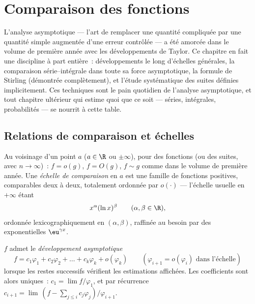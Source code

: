 \chapter{Comparaison des fonctions}\label{ch:b2:comparison}

L'analyse asymptotique --- l'art de remplacer une quantité compliquée
par une quantité simple augmentée d'une erreur contrôlée --- a été
amorcée dans le volume de première année avec les développements de
Taylor. Ce chapitre en fait une discipline à part entière~:
développements le long d'échelles générales, la comparaison
série--intégrale dans toute sa force asymptotique, la formule de
Stirling (démontrée complètement), et l'étude systématique des suites
définies implicitement. Ces techniques sont le pain quotidien de
l'analyse asymptotique, et tout chapitre ultérieur qui estime quoi que
ce soit --- séries, intégrales, probabilités --- se nourrit à cette
table.

\section{Relations de comparaison et échelles}

\begin{definition}\label{def:b2:comparison:landau}
Au voisinage d'un point $a$ ($a \in \R$ ou $\pm\infty$), pour des
fonctions (ou des suites, avec $n \to \infty$)~: $f = o(g)$, $f =
O(g)$, $f \sim g$ comme dans le volume de première année. Une
\emph{échelle de comparaison} en $a$ est
une famille de fonctions positives, comparables deux à deux, totalement
ordonnée par $o(\cdot)$ --- l'échelle usuelle en $+\infty$ étant
\[
x^{\alpha} (\ln x)^{\beta}
\qquad (\alpha, \beta \in \R),
\]
ordonnée lexicographiquement en $(\alpha, \beta)$, raffinée au besoin
par des exponentielles $\eu^{\gamma x}$.
\end{definition}

\begin{definition}\label{def:b2:comparison:expansion}
$f$ admet le \emph{développement asymptotique}
\[
f = c_1 \varphi_1 + c_2\varphi_2 + \dots + c_k \varphi_k +
o(\varphi_k)
\qquad (\varphi_{i+1} = o(\varphi_i) \text{ dans l'échelle})
\]
lorsque les restes successifs vérifient les estimations affichées. Les
coefficients sont alors uniques~: $c_1 = \lim f/\varphi_1$, et par
récurrence $c_{i+1} = \lim\,(f - \sum_{j \leq i}
c_j\varphi_j)/\varphi_{i+1}$.
\end{definition}

